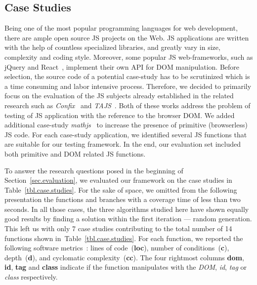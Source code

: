 \subsection{Case Studies}
\label{sub.sec.case.studies}



Being one of the most popular programming languages for web development, there are ample open source JS projects on the Web. JS applications are written with the help of countless specialized libraries, and greatly vary in size, complexity and coding style. Moreover, some popular JS web-frameworks, such as jQuery and React~\cite{todomvc}, implement their own API for DOM manipulation. Before selection, the source code of a potential case-study has to be scrutinized which is a time consuming and labor intensive process. Therefore, we decided to primarily focus on the evaluation of the JS subjects already established in the related research such as \emph{Confix}~\cite{amin:ase15} and \emph{TAJS}~\cite{dom2011, tajsbenchmarks}. Both of these works address the problem of testing of JS application with the reference to the browser DOM. We added additional case-study \emph{mathjs}~\cite{mathjs} to increase the presence of primitive (browserless) JS code. For each case-study application, we identified several JS functions that are suitable for our testing framework. In the end, our evaluation set included both primitive and DOM related JS functions.

To answer the research questions posed in the beginning of Section~\ref{sec.evaluation}, we evaluated our framework on the case studies in Table~\ref{tbl.case.studies}. For the sake of space, we omitted from the following presentation the functions and branches with a coverage time of less than two seconds. In all those cases, the three algorithms studied here have shown equally good results by finding a solution within the first iteration --- random generation. This left us with only 7 case studies contributing to the total number of 14 functions  shown in~Table~\ref{tbl.case.studies}. For each function, we reported the following software metrics~\cite{jsmeter}: lines of code~(\textbf{loc}), number of conditions~(\textbf{c}), depth~(\textbf{d}), and cyclomatic complexity~(\textbf{cc}). The four rightmost columns \textbf{dom}, \textbf{id}, \textbf{tag} and \textbf{class} indicate if the function manipulates with the \emph{DOM}, \emph{id}, \emph{tag} or \emph{class} respectively.

